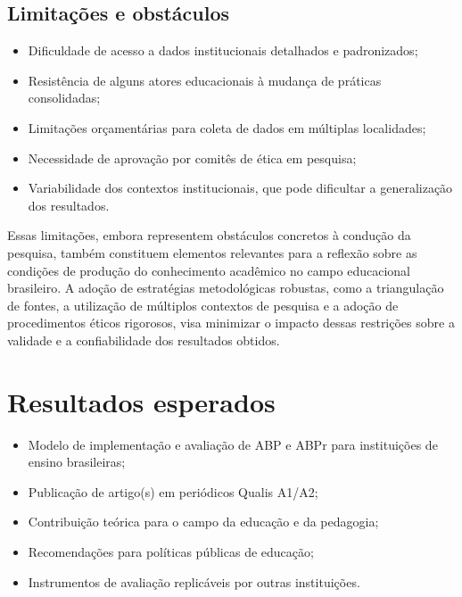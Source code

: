 \subsection{Limitações e obstáculos}
\label{subsec:limitacoes}

\begin{itemize}
    \item Dificuldade de acesso a dados institucionais detalhados e padronizados;
    \item Resistência de alguns atores educacionais à mudança de práticas consolidadas;
    \item Limitações orçamentárias para coleta de dados em múltiplas localidades;
    \item Necessidade de aprovação por comitês de ética em pesquisa;
    \item Variabilidade dos contextos institucionais, que pode dificultar a generalização dos resultados.
\end{itemize}

Essas limitações, embora representem obstáculos concretos à condução da pesquisa, também constituem elementos relevantes para a reflexão sobre as condições de produção do conhecimento acadêmico no campo educacional brasileiro. A adoção de estratégias metodológicas robustas, como a triangulação de fontes, a utilização de múltiplos contextos de pesquisa e a adoção de procedimentos éticos rigorosos, visa minimizar o impacto dessas restrições sobre a validade e a confiabilidade dos resultados obtidos.


\section{Resultados esperados}
\label{sec:resultados_esperados}

\begin{itemize}
    \item Modelo de implementação e avaliação de ABP e ABPr para instituições de ensino brasileiras;
    \item Publicação de artigo(s) em periódicos Qualis A1/A2;
    \item Contribuição teórica para o campo da educação e da pedagogia;
    \item Recomendações para políticas públicas de educação;
    \item Instrumentos de avaliação replicáveis por outras instituições.
\end{itemize}

